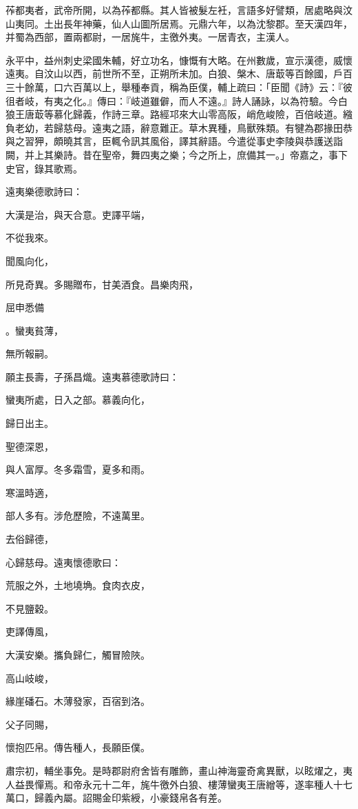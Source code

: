 \begin{pinyinscope}
莋都夷者，武帝所開，以為莋都縣。其人皆被髮左衽，言語多好譬類，居處略與汶山夷同。土出長年神藥，仙人山圖所居焉。元鼎六年，以為沈黎郡。至天漢四年，并蜀為西部，置兩都尉，一居旄牛，主徼外夷。一居青衣，主漢人。

永平中，益州刺史梁國朱輔，好立功名，慷慨有大略。在州數歲，宣示漢德，威懷遠夷。自汶山以西，前世所不至，正朔所未加。白狼、槃木、唐菆等百餘國，戶百三十餘萬，口六百萬以上，舉種奉貢，稱為臣僕，輔上疏曰：「臣聞《詩》云：『彼徂者岐，有夷之化。』傳曰：『岐道雖僻，而人不遠。』詩人誦詠，以為符驗。今白狼王唐菆等慕化歸義，作詩三章。路經邛來大山零高阪，峭危峻險，百倍岐道。繈負老幼，若歸慈母。遠夷之語，辭意難正。草木異種，鳥獸殊類。有犍為郡掾田恭與之習狎，頗曉其言，臣輒令訊其風俗，譯其辭語。今遣從事史李陵與恭護送詣闕，并上其樂詩。昔在聖帝，舞四夷之樂；今之所上，庶備其一。」帝嘉之，事下史官，錄其歌焉。

遠夷樂德歌詩曰：

大漢是治，與天合意。吏譯平端，

不從我來。

聞風向化，

所見奇異。多賜贈布，甘美酒食。昌樂肉飛，

屈申悉備

。蠻夷貧薄，

無所報嗣。

願主長壽，子孫昌熾。遠夷慕德歌詩曰：

蠻夷所處，日入之部。慕義向化，

歸日出主。

聖德深恩，

與人富厚。冬多霜雪，夏多和雨。

寒溫時適，

部人多有。涉危歷險，不遠萬里。

去俗歸德，

心歸慈母。遠夷懷德歌曰：

荒服之外，土地墝埆。食肉衣皮，

不見鹽穀。

吏譯傳風，

大漢安樂。攜負歸仁，觸冒險陜。

高山岐峻，

緣崖磻石。木薄發家，百宿到洛。

父子同賜，

懷抱匹帛。傳告種人，長願臣僕。

肅宗初，輔坐事免。是時郡尉府舍皆有雕飾，畫山神海靈奇禽異獸，以眩燿之，夷人益畏憚焉。和帝永元十二年，旄牛徼外白狼、樓薄蠻夷王唐繒等，遂率種人十七萬口，歸義內屬。詔賜金印紫綬，小豪錢帛各有差。


\end{pinyinscope}
